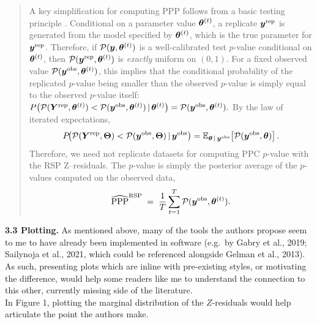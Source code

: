 \documentclass[11pt]{article}
\newcommand*{\mybox}[2]{%
  \par\medskip\noindent
  \colorbox{#1!30}{\parbox{.98\linewidth}{#2}}%
  \par\medskip
}
\begin{document}
\begin{quote}
    
A key simplification for computing PPP follows from a basic testing principle  \citep{Meng1994}. Conditional on a parameter value $\bm{\theta}^{(t)}$, a replicate $\bm{y}^{\text{rep}}$ is generated from the model specified by $\bm{\theta}^{(t)}$, which is the true parameter for $\bm{y}^{\text{rep}}$. Therefore, if \(\mathcal{P}(\bm{y},\bm{\theta}^{(t)})\) is a well-calibrated test \(p\)-value conditional on \(\bm{\theta}^{(t)}\), then \(\mathcal{P}(\bm{y}^{\mathrm{rep}},\bm{\theta}^{(t)})\) is \textit{exactly} uniform on \((0,1)\). For a fixed observed value \(\mathcal{P}(\bm{y}^{\mathrm{obs}},\bm{\theta}^{(t)})\), this implies that the conditional probability of the replicated $p$-value being smaller than the observed $p$-value is simply equal to the observed $p$-value itself:
$P\big(\mathcal{P}(\bm{Y}^{\text{rep}},\bm{\theta}^{(t)}) < \mathcal{P}(\bm{y}^{\text{obs}},\bm{\theta}^{(t)})\,|\, \bm{\theta}^{(t)}\big) = \mathcal{P}(\bm{y}^{\text{obs}},\bm{\theta}^{(t)}).$
By the law of iterated expectations,
\begin{equation}
P\!\big(\mathcal{P}(\bm{Y}^{\text{rep}},\bm{\Theta}) < \mathcal{P}(\bm{y}^{\text{obs}},\bm{\Theta}) \,|\, \bm{y}^{\text{obs}}\big)
=\mathbb{E}_{\bm{\theta}\,|\, \bm{y}^{\text{obs}}}\!\left[\mathcal{P}(\bm{y}^{\text{obs}},\bm{\theta})\right].
\label{eqn:ppp-avg}
\end{equation}
Therefore, we need not replicate datasets for computing PPC $p$-value with the RSP Z–residuals. The $p$-value is simply the posterior average of the $p$-values computed on the observed data,
\begin{equation}
\widehat{\text{PPP}}^{\text{RSP}} \;=\; \frac{1}{T}\sum_{t=1}^{T} \mathcal{P}(\bm{y}^{\text{obs}},\bm{\theta}^{(t)}).
\end{equation}


\end{quote}




\mybox{gray}{\textbf{3.3 Plotting.} As mentioned above, many of the tools the authors propose seem to me to have already been implemented in software (e.g.\ by Gabry et al., 2019; Sailynoja et al., 2021, which could be referenced alongside Gelman et al., 2013). As such, presenting plots which are inline with pre-existing styles, or motivating the difference, would help some readers like me to understand the connection to this other, currently missing side of the literature.\\
In Figure 1, plotting the marginal distribution of the $Z$-residuals would help articulate the point the authors make.}
\end{document}
